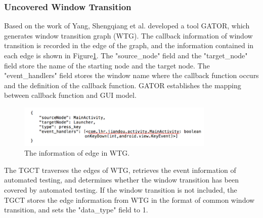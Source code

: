 
\subsubsection{Uncovered Window Transition}
Based on the work of Yang, Shengqiang et al.\cite{yang2018static} developed a tool GATOR, which generates window transition graph (WTG). The callback information of window transition is recorded in the edge of the graph, and the information contained in each edge is shown in Figure\ref{fig:info}. The "source\_node" field and the "target\_node" field store the name of the starting node and the target node. The "event\_handlers" field stores the window name where the callback function occurs and the definition of the callback function. GATOR establishes the mapping between callback function and GUI model. %
\begin{figure}[htbp]
\centering
\centerline{\includegraphics[width=\columnwidth,height=2cm]{fig/6.png}}
\caption{The information of edge in WTG.}
\label{fig:info}
\end{figure}

The TGCT traverses the edges of WTG, retrieves the event information of automated testing, and determines whether the window transition has been covered by automated testing. If the window transition is not included, the TGCT  stores the edge information from WTG in the format of common window transition, and sets the "data\_type" field to 1. 

